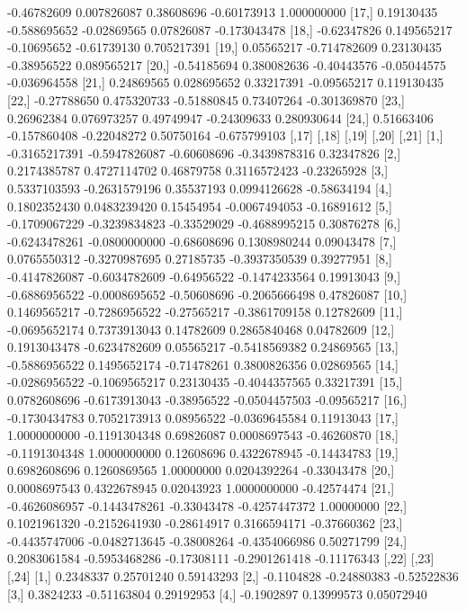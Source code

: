 \documentclass[a4paper]{ article}
\begin{document}
\begin{table}[H]
\begin{Schunk}
\begin{Soutput}
[16,] -0.46782609  0.007826087  0.38608696 -0.60173913  1.000000000
[17,]  0.19130435 -0.588695652 -0.02869565  0.07826087 -0.173043478
[18,] -0.62347826  0.149565217 -0.10695652 -0.61739130  0.705217391
[19,]  0.05565217 -0.714782609  0.23130435 -0.38956522  0.089565217
[20,] -0.54185694  0.380082636 -0.40443576 -0.05044575 -0.036964558
[21,]  0.24869565  0.028695652  0.33217391 -0.09565217  0.119130435
[22,] -0.27788650  0.475320733 -0.51880845  0.73407264 -0.301369870
[23,]  0.26962384  0.076973257  0.49749947 -0.24309633  0.280930644
[24,]  0.51663406 -0.157860408 -0.22048272  0.50750164 -0.675799103
              [,17]         [,18]       [,19]         [,20]       [,21]
 [1,] -0.3165217391 -0.5947826087 -0.60608696 -0.3439878316  0.32347826
 [2,]  0.2174385787  0.4727114702  0.46879758  0.3116572423 -0.23265928
 [3,]  0.5337103593 -0.2631579196  0.35537193  0.0994126628 -0.58634194
 [4,]  0.1802352430  0.0483239420  0.15454954 -0.0067494053 -0.16891612
 [5,] -0.1709067229 -0.3239834823 -0.33529029 -0.4688995215  0.30876278
 [6,] -0.6243478261 -0.0800000000 -0.68608696  0.1308980244  0.09043478
 [7,]  0.0765550312 -0.3270987695  0.27185735 -0.3937350539  0.39277951
 [8,] -0.4147826087 -0.6034782609 -0.64956522 -0.1474233564  0.19913043
 [9,] -0.6886956522 -0.0008695652 -0.50608696 -0.2065666498  0.47826087
[10,]  0.1469565217 -0.7286956522 -0.27565217 -0.3861709158  0.12782609
[11,] -0.0695652174  0.7373913043  0.14782609  0.2865840468  0.04782609
[12,]  0.1913043478 -0.6234782609  0.05565217 -0.5418569382  0.24869565
[13,] -0.5886956522  0.1495652174 -0.71478261  0.3800826356  0.02869565
[14,] -0.0286956522 -0.1069565217  0.23130435 -0.4044357565  0.33217391
[15,]  0.0782608696 -0.6173913043 -0.38956522 -0.0504457503 -0.09565217
[16,] -0.1730434783  0.7052173913  0.08956522 -0.0369645584  0.11913043
[17,]  1.0000000000 -0.1191304348  0.69826087  0.0008697543 -0.46260870
[18,] -0.1191304348  1.0000000000  0.12608696  0.4322678945 -0.14434783
[19,]  0.6982608696  0.1260869565  1.00000000  0.0204392264 -0.33043478
[20,]  0.0008697543  0.4322678945  0.02043923  1.0000000000 -0.42574474
[21,] -0.4626086957 -0.1443478261 -0.33043478 -0.4257447372  1.00000000
[22,]  0.1021961320 -0.2152641930 -0.28614917  0.3166594171 -0.37660362
[23,] -0.4435747006 -0.0482713645 -0.38008264 -0.4354066986  0.50271799
[24,]  0.2083061584 -0.5953468286 -0.17308111 -0.2901261418 -0.11176343
           [,22]       [,23]       [,24]
 [1,]  0.2348337  0.25701240  0.59143293
 [2,] -0.1104828 -0.24880383 -0.52522836
 [3,]  0.3824233 -0.51163804  0.29192953
 [4,] -0.1902897  0.13999573  0.05072940

\end{Soutput}
\end{Schunk}
\end{table}
\end{document}
